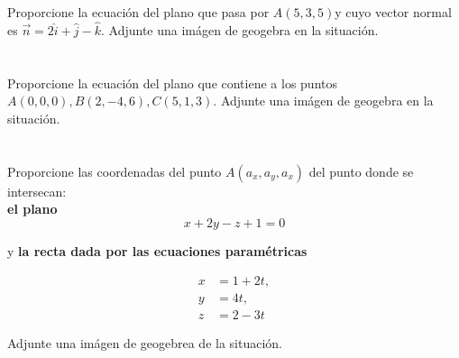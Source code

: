\documentclass[12pt]{article}
\begin{document}
\section{}

Proporcione la ecuación del plano que pasa por $A(5,3,5)$y cuyo vector normal es $\vec{n}=2\hat{i} + \hat{j} - \hat{k}$. Adjunte una imágen de geogebra en la situación.

\section{}

Proporcione la ecuación del plano que contiene a los puntos $A(0,0,0) , B(2,-4,6), C(5,1,3)$. Adjunte una imágen de geogebra en la situación.

\section{}

Proporcione las coordenadas del punto $A(a_x,a_y,a_x)$ del punto donde se intersecan:\\

\textbf{el plano} \\

\[ x + 2y -z+1 =0 \]

y \textbf{la recta dada por las ecuaciones paramétricas}

\begin{align*}
  x &= 1 + 2t,\\
  y &=4t,\\
  z &= 2 - 3t
\end{align*}

Adjunte una imágen de geogebrea de la situación.
\end{document}
